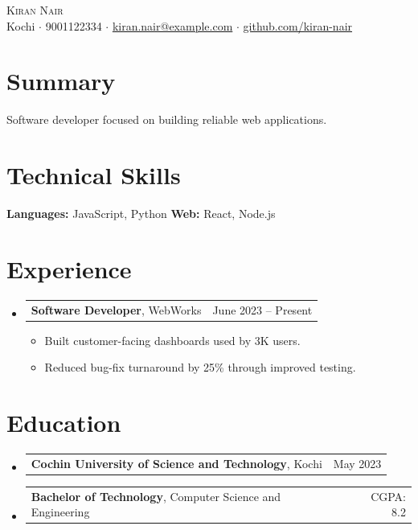 \documentclass[letterpaper,11pt]{article}
\makeatletter
\newcommand{\resumeItem}[1]{%
  \item\small{#1 \vspace{-1pt}}%
}
\newcommand{\resumeSubheading}[3]{%
  \vspace{2pt}\item
    \begin{tabular*}{\linewidth}[t]{l@{\extracolsep{\fill}}r}
      \textbf{#1}, #2 & #3 \\
    \end{tabular*}\vspace{-4pt}%
}
\newcommand{\resumeSubHeadingListStart}{\begin{itemize}[leftmargin=0.15in, label={}, parsep=0pt, topsep=0pt, itemsep=4pt]}
\newcommand{\resumeSubHeadingListEnd}{\end{itemize}}
\newcommand{\resumeItemListStart}{\begin{itemize}[leftmargin=0.15in, parsep=0pt, topsep=2pt, itemsep=3pt, label=$\bullet$]}
\newcommand{\resumeItemListEnd}{\end{itemize}\vspace{-2pt}}
\makeatother
\begin{document}
\begin{center}
{\Huge \scshape Kiran Nair} \\ \vspace{5pt}
\small Kochi $\cdot$ 9001122334 $\cdot$ \href{mailto:kiran.nair@example.com}{kiran.nair@example.com} $\cdot$ \href{https://github.com/kiran-nair}{github.com/kiran-nair}
\end{center}

\section{Summary}
{\small Software developer focused on building reliable web applications.}

\section{Technical Skills}
\begin{itemize}[leftmargin=0.15in, label={}, parsep=0pt, topsep=0pt, itemsep=0pt]
    \small{\item{
     \textbf{Languages:} JavaScript, Python
     \textbf{Web:} React, Node.js
    }}
\end{itemize}

\section{Experience}
\resumeSubHeadingListStart
\resumeSubheading{Software Developer}{WebWorks}{June 2023 -- Present}
\resumeItemListStart
\resumeItem{Built customer-facing dashboards used by 3K users.}
\resumeItem{Reduced bug-fix turnaround by 25\% through improved testing.}
\resumeItemListEnd
\resumeSubHeadingListEnd

\section{Education}
\resumeSubHeadingListStart
\resumeSubheading{Cochin University of Science and Technology}{Kochi}{May 2023}
\vspace{-15pt}
\resumeSubheading{Bachelor of Technology}{Computer Science and Engineering}{CGPA: 8.2}
\resumeSubHeadingListEnd
\end{document}
